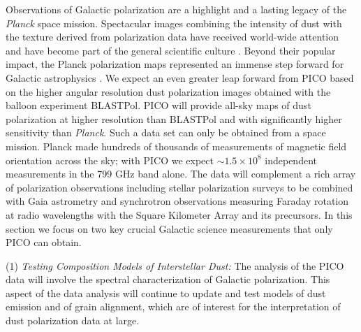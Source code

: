\documentclass[PICOReport.tex]{subfiles}
\begin{document}
Observations of Galactic polarization are a highlight and a lasting legacy of the {\em Planck} space mission. 
Spectacular images combining the intensity of dust with the texture derived from polarization data 
have received world-wide attention and have become part of the general scientific culture \citep{PlanckI2015}. 
Beyond their popular impact, the Planck polarization maps represented an 
immense step forward for Galactic astrophysics \citep{Planck2018:XII}. 
We expect an even greater leap forward from PICO based on the higher angular resolution dust polarization images obtained with the balloon experiment BLASTPol.  
PICO will provide all-sky maps of dust polarization at higher resolution than BLASTPol and with significantly higher sensitivity than {\em Planck}. Such a data set can only be obtained from a space mission. Planck made hundreds of thousands of measurements of magnetic field orientation across the sky; with PICO we expect $\sim1.5\times 10^8$ independent measurements in the 799 GHz band alone.
The data will complement a rich array of polarization observations including stellar polarization surveys to be 
combined with Gaia astrometry and synchrotron observations measuring Faraday rotation at radio wavelengths 
with the Square Kilometer Array and its precursors. 
In this section we focus on two key crucial Galactic science measurements that only PICO can obtain.

(1) {\em Testing Composition Models of Interstellar Dust:}
The analysis of the PICO data will involve the spectral characterization of Galactic polarization. 
This aspect of the data analysis will continue to update and test models of dust emission and of grain alignment, which are of interest for the interpretation of dust polarization data at large.
\end{document}
